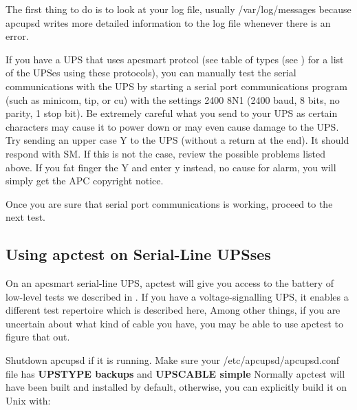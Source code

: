{{{{{{{\begin{itemize}
\begin{verbatim}
\end{verbatim}
\normalsize

\end{itemize}

The first thing to do is to look at your log file, usually /var/log/messages
because apcupsd writes more detailed information to the log file whenever
there is an error.  

If you have a UPS that uses apcsmart protcol (see table of types (see 
) for a list of the UPSes using
these protocols), you can manually test the serial communications with the UPS
by starting a serial port communications program (such as minicom, tip, or cu)
with the settings 2400 8N1 (2400 baud, 8 bits, no parity, 1 stop bit). Be
extremely careful what you send to your UPS as certain characters may cause it
to power down or may even cause damage to the UPS. Try sending an upper case Y
to the UPS (without a return at the end). It should respond with SM. If this
is not the case, review the possible problems listed above. If you fat finger
the Y and enter y instead, no cause for alarm, you will simply get the APC
copyright notice.  

Once you are sure that serial port communications is working, proceed to the
next test. 

\label{Using-apctest-on-Serial_002dLine-UPSses}

\subsection*{Using apctest on Serial-Line UPSses}

\label{index-apctest-222}
\label{index-Testing_002c-with-apctest-223}
On an apcsmart serial-line UPS, apctest will give you access to the battery of
low-level tests we described in 
.  If you have a voltage-signalling UPS, it
enables a different test repertoire which is described here, Among other
things, if you are uncertain about what kind of cable you have, you may be
able to use apctest to figure that out.  

Shutdown apcupsd if it is running. Make sure your /etc/apcupsd/apcupsd.conf
file has {\bf UPSTYPE backups} and {\bf UPSCABLE simple} Normally apctest will
have been built and installed by default, otherwise, you can explicitly build
it on Unix with: 

}}}}}}}
